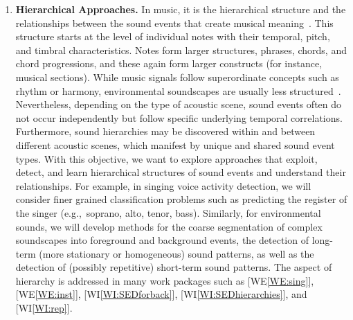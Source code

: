 \documentclass[11pt,a4paper]{article}
\newcommand{\egc}{e.g.,\ }
\theoremstyle{plain} \newtheorem{define}{Definition}[section]
\begin{document}
{\begin{enumerate}
\item \label{objective:renew_hierarch}
\textbf{Hierarchical Approaches.}
%
In music, it is the hierarchical structure and the relationships between the sound events that create musical meaning~\cite{PaulusMK10_MusicStructure-STAR_ISMIR}. This structure starts at the level of individual notes with their temporal, pitch, and timbral characteristics. Notes form larger structures, phrases, chords, and chord progressions, and these again form larger constructs (for instance, musical sections). 
%
While music signals follow superordinate concepts such as rhythm or harmony, environmental soundscapes are usually less structured~\cite{VirtanenPE08_CompAnalSoundScene_Springer}. Nevertheless, depending on the type of acoustic scene, sound events often do not occur independently but follow specific underlying temporal correlations. Furthermore, sound hierarchies may be discovered within and between different acoustic scenes, which manifest by unique and shared sound event types.
%
With this objective, we want to explore approaches that exploit, detect, and learn hierarchical structures of sound events and understand their relationships. 
%
%
For example, in singing voice activity detection, we will consider finer grained classification problems such as predicting the register of the singer (\egc soprano, alto, tenor, bass). 
%
%
Similarly, for environmental sounds, we will develop methods for the coarse segmentation of complex soundscapes into foreground and background events, the detection of long-term (more stationary or homogeneous) sound patterns, as well as the detection of (possibly repetitive) short-term sound patterns.
%
The aspect of hierarchy is addressed in many work packages such as [WE\ref{WE:sing}], [WE\ref{WE:inst}], [WI\ref{WI:SEDforback}], [WI\ref{WI:SEDhierarchies}], and [WI\ref{WI:rep}].
%
%

\end{enumerate}}
\end{document}
